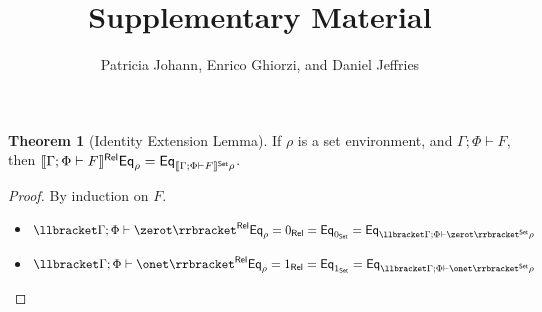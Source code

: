 \documentclass[acmsmall,review,anonymous]{acmart}
\title[Supplementary Material]{Supplementary Material} %
\author{Patricia Johann, Enrico Ghiorzi, and Daniel Jeffries}
\affiliation{
  \institution{Appalachian State University}            %
}
\theoremstyle{definition}
\newtheorem*{nono-theorem}{Theorem}
\newcommand{\set}{\mathsf{Set}}
\begin{document}
\maketitle

\begin{nono-theorem}[Identity Extension Lemma]\label{thm:iel}
If $\rho$ is a set environment, and $\Gamma; \Phi \vdash F$, then
$\relsem{\Gamma; \Phi \vdash F} \Eq_\rho = \Eq_{\setsem{\Gamma; \Phi
    \vdash F}\rho}$.
\end{nono-theorem}
\begin{proof}
By induction on $F$.
\begin{itemize}
\item $\relsem{\Gamma; \Phi \vdash \zerot} \Eq_{\rho} = 0_\rel =
  \Eq_{0_\set} = \Eq_{\setsem{\Gamma; \Phi \vdash \zerot}\rho}$
\item $\relsem{\Gamma; \Phi \vdash \onet} \Eq_{\rho} = 1_\rel =
  \Eq_{1_\set} = \Eq_{\setsem{\Gamma; \Phi \vdash \onet}\rho}$


\end{itemize}
\end{proof}
\end{document}
